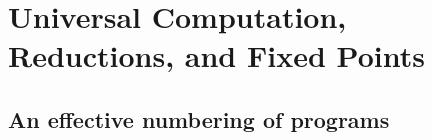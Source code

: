 
\chapter[Universal Computation and Reductions]{Universal Computation, Reductions, and Fixed Points}
\label{sec:p04-universal-reductions}

\section{An effective numbering of programs}
\label{sec:p04-effective-numbering}

